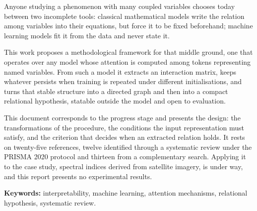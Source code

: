 Anyone studying a phenomenon with many coupled variables chooses today between two incomplete tools: classical mathematical models write the relation among variables into their equations, but force it to be fixed beforehand; machine learning models fit it from the data and never state it.

This work proposes a methodological framework for that middle ground, one that operates over any model whose attention is computed among tokens representing named variables. From such a model it extracts an interaction matrix, keeps whatever persists when training is repeated under different initialisations, and turns that stable structure into a directed graph and then into a compact relational hypothesis, statable outside the model and open to evaluation.

This document corresponds to the progress stage and presents the design: the transformations of the procedure, the conditions the input representation must satisfy, and the criterion that decides when an extracted relation holds. It rests on twenty-five references, twelve identified through a systematic review under the PRISMA 2020 protocol and thirteen from a complementary search. Applying it to the case study, spectral indices derived from satellite imagery, is under way, and this report presents no experimental results.

{\bf Keywords:} interpretability, machine learning, attention mechanisms, relational hypothesis, systematic review.
\endgroup
